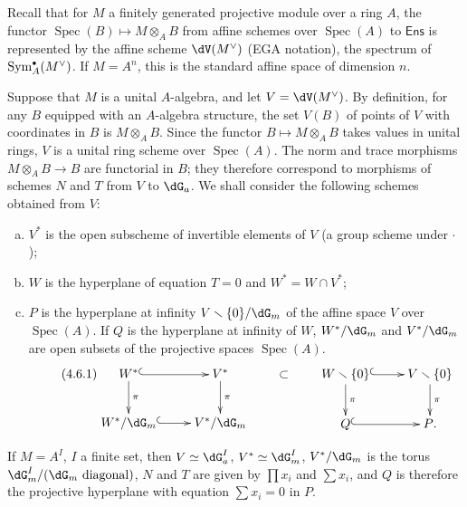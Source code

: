 \documentclass[oneside]{book}
\DeclareMathOperator{\spec}{Spec}
\renewcommand{\setminus}{\smallsetminus}
\theoremstyle{sga-source}
\theoremstyle{sga-source-dash}
\theoremstyle{sga-source-dotdash}
\theoremstyle{sga-source-number-note-dash}
\theoremstyle{sga-source-note-number-dotdash}
\theoremstyle{sga-source-example-dotdash}
\theoremstyle{sga-source-inline-number}
\theoremstyle{sga-source-bare-number}
\theoremstyle{sga-source}
\let\oldbullet\bullet
\renewcommand{\bullet}{\textnormal{\tiny$\oldbullet$}}
\begin{document}
\subsection{}\label{VI:4-6}

Recall that for $M$ a finitely generated projective module over a ring $A$, the 
functor $\spec(B)\mapsto M\otimes_A B$ from affine schemes over $\spec(A)$ 
to $\mathsf{Ens}$ is represented by the affine scheme $\dV(M^\vee)$ 
(EGA notation), the spectrum of $\operatorname{Sym}_A^\bullet(M^\vee)$. If 
$M=A^n$, this is the standard affine space of dimension $n$. 

Suppose that $M$ is a unital $A$-algebra, and let 
$V=\dV(M^\vee)$. By definition, for any $B$ equipped with an $A$-algebra structure, the set 
$V(B)$ of points of $V$ with coordinates in $B$ is $M\otimes_A B$. Since the 
functor $B\mapsto M\otimes_A B$ takes values in unital rings, 
$V$ is a unital ring scheme over $\spec(A)$. The 
norm and trace morphisms $M\otimes_A B\to B$ are functorial in $B$; they 
therefore correspond to morphisms of schemes $N$ and $T$ from $V$ to 
$\dG_a$. We shall consider the following schemes obtained from $V$: 
\begin{enumerate}[a)]
  \item $V^\ast$ is the open subscheme of invertible elements of $V$ (a group 
    scheme under $\cdot$);
  \item $W$ is the hyperplane of equation $T=0$ and $W^\ast=W\cap V^\ast$; 
  \item $P$ is the hyperplane at infinity $V\setminus \{0\}/\dG_m$ of the affine 
    space $V$ over $\spec(A)$. If $Q$ is the hyperplane at infinity of $W$, 
    $W^\ast/\dG_m$ and $V^\ast/\dG_m$ are open subsets of the projective spaces 
     $\spec(A)$. 
    \begin{equation*}\tag{4.6.1}\label{VI:eq:4-6-1}
    \xymatrix{
      W^\ast \ar@{^{(}->}[r] \ar[d]^-\pi 
        & V^\ast \ar[d]^-\pi \\
      W^\ast/\dG_m \ar@{^{(}->}[r] 
        & V^\ast/\dG_m 
    }\qquad\subset\qquad
    \xymatrix{
      W\setminus \{0\} \ar@{^{(}->}[r] \ar[d]^-\pi 
        & V\setminus \{0\} \ar[d]^-\pi \\
      Q \ar@{^{(}->}[r] 
        & P \text{.}
    }
    \end{equation*}
\end{enumerate}

If $M=A^I$, $I$ a finite set, then $V\simeq \dG_a^I$, $V^\ast\simeq \dG_m^I$, 
$V^\ast/\dG_m$ is the torus $\dG_m^I/(\dG_m\text{ diagonal})$, $N$ and $T$ 
are given by $\prod x_i$ and $\sum x_i$, and $Q$ is therefore the projective 
hyperplane with equation $\sum x_i=0$ in $P$. 
\end{document}
